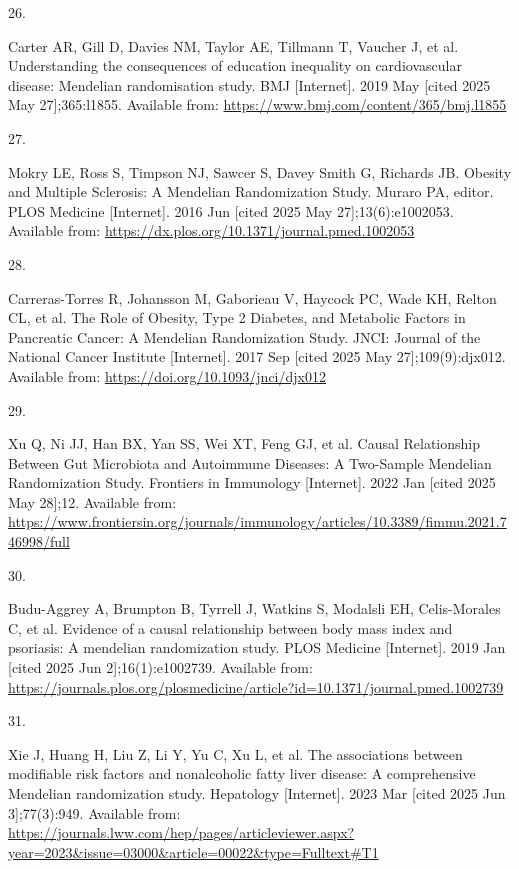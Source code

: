 \documentclass[
]{article}
\newlength{\cslhangindent}
\newlength{\csllabelwidth}
\newenvironment{CSLReferences}[2] %
 {\begin{list}{}{%
  \setlength{\itemindent}{0pt}
  \setlength{\leftmargin}{0pt}
  \setlength{\parsep}{0pt}
  \ifodd #1
   \setlength{\leftmargin}{\cslhangindent}
   \setlength{\itemindent}{-1\cslhangindent}
  \fi
  \setlength{\itemsep}{#2\baselineskip}}}
 {\end{list}}
\newcommand{\CSLLeftMargin}[1]{\parbox[t]{\csllabelwidth}{\strut#1\strut}}
\newcommand{\CSLRightInline}[1]{\parbox[t]{\linewidth - \csllabelwidth}{\strut#1\strut}}
\begin{document}
\begin{CSLReferences}{0}{1}
\CSLLeftMargin{26. }%
\CSLRightInline{Carter AR, Gill D, Davies NM, Taylor AE, Tillmann T, Vaucher J, et al. Understanding the consequences of education inequality on cardiovascular disease: Mendelian randomisation study. BMJ {[}Internet{]}. 2019 May {[}cited 2025 May 27{]};365:l1855. Available from: \url{https://www.bmj.com/content/365/bmj.l1855}}

\CSLLeftMargin{27. }%
\CSLRightInline{Mokry LE, Ross S, Timpson NJ, Sawcer S, Davey Smith G, Richards JB. Obesity and {Multiple} {Sclerosis}: {A} {Mendelian} {Randomization} {Study}. Muraro PA, editor. PLOS Medicine {[}Internet{]}. 2016 Jun {[}cited 2025 May 27{]};13(6):e1002053. Available from: \url{https://dx.plos.org/10.1371/journal.pmed.1002053}}

\CSLLeftMargin{28. }%
\CSLRightInline{Carreras-Torres R, Johansson M, Gaborieau V, Haycock PC, Wade KH, Relton CL, et al. The {Role} of {Obesity}, {Type} 2 {Diabetes}, and {Metabolic} {Factors} in {Pancreatic} {Cancer}: {A} {Mendelian} {Randomization} {Study}. JNCI: Journal of the National Cancer Institute {[}Internet{]}. 2017 Sep {[}cited 2025 May 27{]};109(9):djx012. Available from: \url{https://doi.org/10.1093/jnci/djx012}}

\CSLLeftMargin{29. }%
\CSLRightInline{Xu Q, Ni JJ, Han BX, Yan SS, Wei XT, Feng GJ, et al. Causal {Relationship} {Between} {Gut} {Microbiota} and {Autoimmune} {Diseases}: {A} {Two}-{Sample} {Mendelian} {Randomization} {Study}. Frontiers in Immunology {[}Internet{]}. 2022 Jan {[}cited 2025 May 28{]};12. Available from: \url{https://www.frontiersin.org/journals/immunology/articles/10.3389/fimmu.2021.746998/full}}

\CSLLeftMargin{30. }%
\CSLRightInline{Budu-Aggrey A, Brumpton B, Tyrrell J, Watkins S, Modalsli EH, Celis-Morales C, et al. Evidence of a causal relationship between body mass index and psoriasis: {A} mendelian randomization study. PLOS Medicine {[}Internet{]}. 2019 Jan {[}cited 2025 Jun 2{]};16(1):e1002739. Available from: \url{https://journals.plos.org/plosmedicine/article?id=10.1371/journal.pmed.1002739}}

\CSLLeftMargin{31. }%
\CSLRightInline{Xie J, Huang H, Liu Z, Li Y, Yu C, Xu L, et al. The associations between modifiable risk factors and nonalcoholic fatty liver disease: {A} comprehensive {Mendelian} randomization study. Hepatology {[}Internet{]}. 2023 Mar {[}cited 2025 Jun 3{]};77(3):949. Available from: \url{https://journals.lww.com/hep/pages/articleviewer.aspx?year=2023&issue=03000&article=00022&type=Fulltext\#T1}}


\end{CSLReferences}
\end{document}
